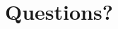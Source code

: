 \documentclass[aspectratio=43,handout,bigger]{beamer}
\begin{document}
%
%
%
%
%
%
%
%
%


\section{Questions?}
\end{document}
